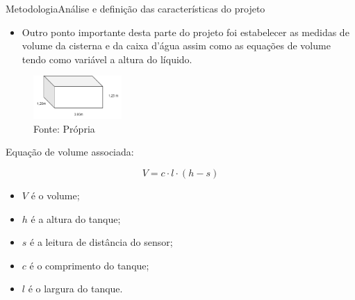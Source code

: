 \begin{frame}{Metodologia}{Análise e definição das características do projeto}
 \begin{itemize}
   \item Outro ponto importante desta parte do projeto foi estabelecer as medidas de volume da cisterna e da caixa d'água assim como as equações de volume tendo como variável a altura do líquido.
 \end{itemize}

\end{frame}

\begin{frame}{}
  \begin{figure}[H]
    \centering
    \caption{Representação das dimensões da cisterna.}
    \includegraphics[width=0.3\textwidth]{figuras/volume.png}
    \caption{\tiny{Fonte: Própria}}
    \label{fig:volume_cisterna}
  \end{figure}
  
  Equação de volume associada:
  
  \begin{equation}
  V = c \cdot l \cdot (h-s)  
  \end{equation}
  
  \begin{itemize}
    \item $V$ é o volume;
    \item $h$ é a altura do tanque;
    \item $s$ é a leitura de distância do sensor;
    \item $c$ é o comprimento do tanque;
    \item $l$ é o largura do tanque.
  \end{itemize}
\end{frame}

